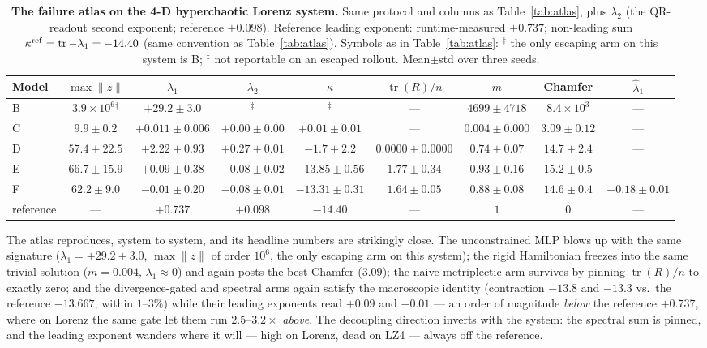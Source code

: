 \documentclass[journal]{IEEEtran}
\newcommand{\tr}{\operatorname{tr}}
\begin{document}
\begin{table}[t]
\centering
\caption{\textbf{The failure atlas on the 4-D hyperchaotic Lorenz
system.} Same protocol and columns as Table~\ref{tab:atlas}, plus
$\lambda_2$ (the QR-readout second exponent; reference $+0.098$).
Reference leading exponent: runtime-measured $+0.737$; non-leading sum
$\kappa^{\rm ref}=\tr-\lambda_1=-14.40$ (same convention as
Table~\ref{tab:atlas}). Symbols as in Table~\ref{tab:atlas}:
${}^\dagger$ the only escaping arm on this system is B;
${}^\ddagger$ not reportable on an escaped rollout. Mean$\pm$std over
three seeds.}
\label{tab:lz4}
\begingroup\scriptsize\setlength{\tabcolsep}{2pt}
\begin{tabular}{lcccccccc}
\toprule
Model & $\max\|z\|$ & $\lambda_1$ & $\lambda_2$ & $\kappa$ & $\tr(R)/n$ & $m$ & Chamfer & $\hat\lambda_1$ \\
\midrule
B & $3.9{\times}10^6{}^{\dagger}$ & $+29.2\pm3.0$ & ${}^{\ddagger}$ & ${}^{\ddagger}$ & --- & $4699\pm4718$ & $8.4{\times}10^3$ & --- \\
C & $9.9\pm0.2$ & $+0.011\pm0.006$ & $+0.00\pm0.00$ & $+0.01\pm0.01$ & --- & $0.004\pm0.000$ & $3.09\pm0.12$ & --- \\
D & $57.4\pm22.5$ & $+2.22\pm0.93$ & $+0.27\pm0.01$ & $-1.7\pm2.2$ & $0.0000\pm0.0000$ & $0.74\pm0.07$ & $14.7\pm2.4$ & --- \\
E & $66.7\pm15.9$ & $+0.09\pm0.38$ & $-0.08\pm0.02$ & $-13.85\pm0.56$ & $1.77\pm0.34$ & $0.93\pm0.16$ & $15.2\pm0.5$ & --- \\
F & $62.2\pm9.0$ & $-0.01\pm0.20$ & $-0.08\pm0.01$ & $-13.31\pm0.31$ & $1.64\pm0.05$ & $0.88\pm0.08$ & $14.6\pm0.4$ & $-0.18\pm0.01$ \\
\midrule
reference & --- & $+0.737$ & $+0.098$ & $-14.40$ & --- & $1$ & $0$ & --- \\
\bottomrule
\end{tabular}
\endgroup
\end{table}

The atlas reproduces, system to system, and its headline numbers are
strikingly close. The unconstrained MLP blows up with the same
signature ($\lambda_1=+29.2\pm3.0$, $\max\|z\|$ of order $10^6$, the
only escaping arm on this system); the rigid Hamiltonian freezes into
the same trivial solution ($m=0.004$, $\lambda_1\approx0$) and again
posts the best Chamfer ($3.09$); the naive metriplectic arm survives
by pinning $\tr(R)/n$ to exactly zero; and the divergence-gated and
spectral arms again satisfy the macroscopic identity (contraction
$-13.8$ and $-13.3$ vs.\ the reference $-13.667$, within $1$--$3\%$)
while their leading exponents read $+0.09$ and $-0.01$ --- an order of
magnitude \emph{below} the reference $+0.737$, where on Lorenz the same
gate let them run $2.5$--$3.2\times$ \emph{above}. The decoupling
direction inverts with the system: the spectral sum is pinned, and the
leading exponent wanders where it will --- high on Lorenz, dead on
LZ4 --- always off the reference.
\end{document}

